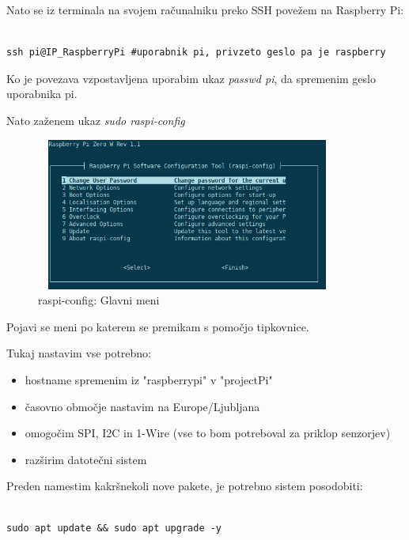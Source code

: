 \documentclass[11pt]{article}
\begin{document}
Nato se iz terminala na svojem računalniku preko SSH povežem na Raspberry Pi:

\begin{verbatim}
  
ssh pi@IP_RaspberryPi #uporabnik pi, privzeto geslo pa je raspberry
\end{verbatim}

Ko je povezava vzpostavljena uporabim ukaz \textit{passwd pi}, da spremenim geslo uporabnika pi.

Nato zaženem ukaz \textit{sudo raspi-config}
\begin{figure}[h]
\centering
\includegraphics[width=10cm, height=5cm]{images/raspi-config.png}
\caption{raspi-config: Glavni meni}
\end{figure}

Pojavi se meni po katerem se premikam s pomočjo tipkovnice.

Tukaj nastavim vse potrebno:
\begin{itemize}
    \item hostname spremenim iz "raspberrypi" v "projectPi"
    \item časovno območje nastavim na Europe/Ljubljana
    \item omogočim SPI, I2C in 1-Wire (vse to bom potreboval za priklop senzorjev)
    \item razširim datotečni sistem
\end{itemize}

Preden namestim kakršnekoli nove pakete, je potrebno sistem posodobiti:

\begin{verbatim}
  
sudo apt update && sudo apt upgrade -y
\end{verbatim}
\end{document}
